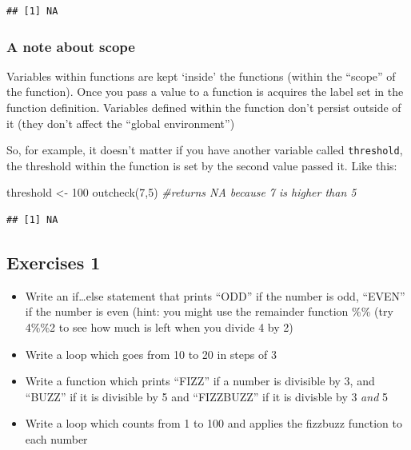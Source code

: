 \documentclass[
]{book}
\newenvironment{Shaded}{\begin{snugshade}}{\end{snugshade}}
\newcommand{\CommentTok}[1]{\textcolor[rgb]{0.56,0.35,0.01}{\textit{#1}}}
\newcommand{\DecValTok}[1]{\textcolor[rgb]{0.00,0.00,0.81}{#1}}
\newcommand{\FunctionTok}[1]{\textcolor[rgb]{0.00,0.00,0.00}{#1}}
\newcommand{\NormalTok}[1]{#1}
\newcommand{\OtherTok}[1]{\textcolor[rgb]{0.56,0.35,0.01}{#1}}
\providecommand{\tightlist}{%
  \setlength{\itemsep}{0pt}\setlength{\parskip}{0pt}}
\begin{document}
\begin{verbatim}
## [1] NA
\end{verbatim}

\hypertarget{a-note-about-scope}{%
\subsubsection{A note about scope}\label{a-note-about-scope}}

Variables within functions are kept `inside' the functions (within the ``scope'' of the function). Once you pass a value to a function is acquires the label set in the function definition. Variables defined within the function don't persist outside of it (they don't affect the ``global environment'')

So, for example, it doesn't matter if you have another variable called \texttt{threshold}, the threshold within the function is set by the second value passed it. Like this:

\begin{Shaded}
\begin{Highlighting}[]
\NormalTok{threshold }\OtherTok{\textless{}{-}} \DecValTok{100}
\FunctionTok{outcheck}\NormalTok{(}\DecValTok{7}\NormalTok{,}\DecValTok{5}\NormalTok{) }\CommentTok{\#returns NA because 7 is higher than 5}
\end{Highlighting}
\end{Shaded}

\begin{verbatim}
## [1] NA
\end{verbatim}

\hypertarget{exercises-1-1}{%
\subsection{Exercises 1}\label{exercises-1-1}}

\begin{itemize}
\tightlist
\item
  Write an if\ldots else statement that prints ``ODD'' if the number is odd, ``EVEN'' if the number is even (hint: you might use the remainder function \%\% (try 4\%\%2 to see how much is left when you divide 4 by 2)
\item
  Write a loop which goes from 10 to 20 in steps of 3
\item
  Write a function which prints ``FIZZ'' if a number is divisible by 3, and ``BUZZ'' if it is divisible by 5 and ``FIZZBUZZ'' if it is divisble by 3 \emph{and} 5
\item
  Write a loop which counts from 1 to 100 and applies the fizzbuzz function to each number
\end{itemize}
\end{document}
